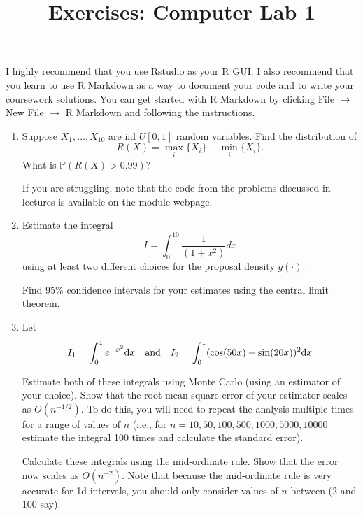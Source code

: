 \documentclass[12pt,a4paper]{article}
\title{Exercises: Computer Lab 1}
\begin{document}
\date{}
\maketitle



I highly recommend that you use Rstudio as your R GUI. I also recommend that you learn to use R Markdown as a way to document your code and to write your coursework solutions. You can get started with R Markdown by clicking File $\rightarrow$ New File $\rightarrow$ R Markdown and following the instructions.

\begin{enumerate}
\item 

Suppose $X_1, \ldots, X_{10}$ are iid $U[0,1]$ random variables. Find the distribution of 
$$R(X) = \max_i\{X_i\} - \min_i \{X_i\}.$$
What is $\mathbb{P}(R(X) > 0.99)$?

If you are struggling, note that the code from the problems discussed in lectures is available on the module webpage.


\item Estimate the integral 
$$I = \int_{0}^{10}\frac{1}{(1+x^2)} dx$$ 
using at least two different choices for the proposal density  $g(\cdot)$.

Find 95\% confidence intervals for your estimates using the central limit theorem.


\item Let 
$$I_1 = \int_0^1 e^{-x^2} {\rm d} x \quad \mbox{and}\quad I_2 = \int_0^1 (\cos(50x) + \sin(20x))^2 {\rm d} x$$

Estimate both of these integrals using Monte Carlo (using an estimator of your choice). Show that the root mean square error of your estimator scales as $O(n^{-1/2})$. To do this, you will need to repeat the analysis multiple times for a range of values of $n$ (i.e., for $n=10,50,100,500,1000,5000,10000$ estimate the integral 100 times and calculate the standard error).

Calculate these integrals using the mid-ordinate rule. Show that the error now scales as $O(n^{-2})$. Note that because the mid-ordinate rule is very accurate for 1d intervals, you should only consider values of $n$ between (2 and 100 say).


\end{enumerate}
\end{document}
